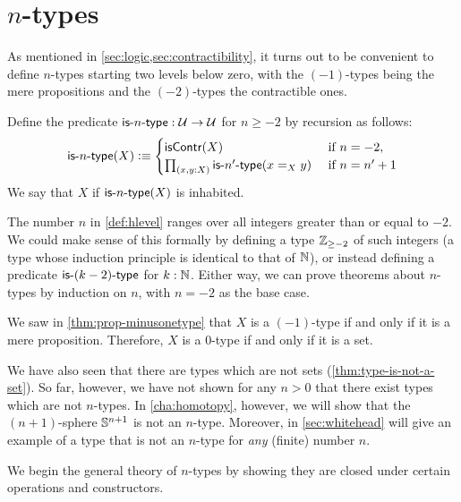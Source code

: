 \section{$n$-types}
\label{sec:n-types}

As mentioned in \autoref{sec:logic,sec:contractibility}, it turns out to be convenient to define $n$-types starting two levels below zero, with the $(-1)$-types being the mere propositions and the $(-2)$-types the contractible ones.

\begin{defn}\label{def:hlevel}
  Define the predicate $\mathsf{is}\mbox{-}{n}\mbox{-}\mathsf{type} : \mathcal{U} \to \mathcal{U}$ for $n \geq -2$ by recursion as follows:
  \[ \istype{n}(X) \defeq
  \begin{cases}
    \iscontr(X) & \text{ if } n = -2 , \\
    \prd{x,y : X} \istype{n'}(\id[X]{x}{y}) & \text{ if } n = n'+1
  \end{cases}
  \]
  We say that $X$  if $\mathsf{is}\mbox{-}{n}\mbox{-}\mathsf{type}(X)$ is inhabited.
\end{defn}

\begin{rmk}
  The number $n$ in \autoref{def:hlevel} ranges over all integers greater than or equal to $-2$.
  We could make sense of this formally by defining a type $\mathbb{Z}_{{\geq}-2}$ of such integers (a type whose induction principle is identical to that of $\mathbb{N}$), or instead defining a predicate $\mathsf{is}\mbox{-}{(k-2)}\mbox{-}\mathsf{type}$ for $k : \mathbb{N}$.
  Either way, we can prove theorems about $n$-types by induction on $n$, with $n = -2$ as the base case.
\end{rmk}

\begin{eg}
  We saw in \autoref{thm:prop-minusonetype} that $X$ is a $(-1)$-type if and only if it is a mere proposition.
  Therefore, $X$ is a $0$-type if and only if it is a set.
\end{eg}

We have also seen that there are types which are not sets (\autoref{thm:type-is-not-a-set}).
So far, however, we have not shown for any $n>0$ that there exist types which are not $n$-types.
In \autoref{cha:homotopy}, however, we will show that the $(n+1)$-sphere $\mathbb{S}^{n+1}$ is not an $n$-type.
Moreover, in \autoref{sec:whitehead} will give an example of a type that is not an $n$-type for \emph{any} (finite) number $n$.

We begin the general theory of $n$-types by showing they are closed under certain operations and constructors.

